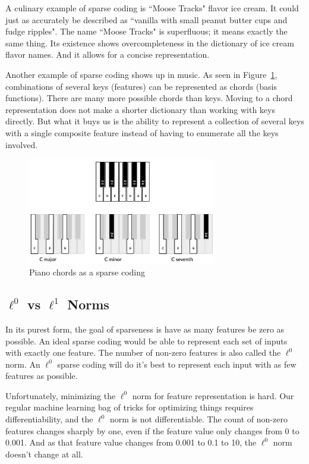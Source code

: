 A culinary example of sparse coding is ``Moose Tracks" flavor ice cream.
It could just as accurately be described as ``vanilla with small
peanut butter cups and fudge ripples". The name ``Moose Tracks" is
superfluous; it means exactly the same thing.
Its existence shows overcompleteness in the dictionary
of ice cream flavor names. And it allows for a concise representation.

Another example of sparse coding shows up in music. As seen in
Figure~\ref{fig:chords}, combinations of several keys (features)
can be represented as chords (basis functions). There are many more
possible chords than keys. Moving to a chord representation does not
make a shorter dictionary than working with keys directly. But what
it buys us is the ability to represent a collection of several keys with
a single composite feature instead of having to enumerate
all the keys involved. 

\begin{figure}[ht]
\vskip 0.2in
\begin{center}
\centerline{\includegraphics[width=3.25in]{images/chords.png}}
\caption{Piano chords as a sparse coding}
\label{fig:chords}
\end{center}
\vskip -0.2in
\end{figure}

\subsection{$\ell^0$ vs $\ell^1$ Norms}
\label{subsec:sparsenorms}

In its purest form, the goal of sparseness is have as many features be
zero as possible. An ideal sparse coding would be able to represent each
set of inputs with exactly one feature. The number of non-zero features
is also called the $\ell^0$ norm. An $\ell^0$ sparse coding will
do it's best to represent each input with as few features as possible.

Unfortunately, minimizing the $\ell^0$ norm for feature representation is hard.
Our regular machine learning bag of tricks for optimizing things
requires differentiability, and the $\ell^0$ norm is not differentiable. The
count of non-zero features changes sharply by one, even if the feature
value only changes from 0 to 0.001. And as that feature value changes from
0.001 to 0.1 to 10, the $\ell^0$ norm doesn't change at all.

